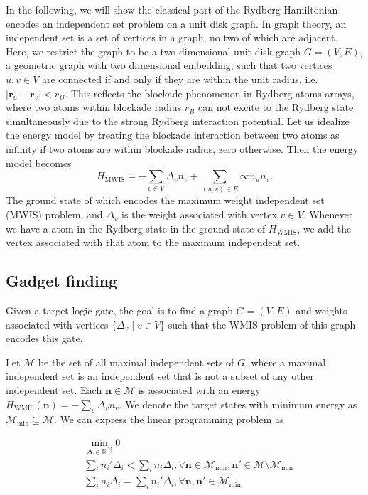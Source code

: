 \documentclass[twocolumn,superscriptaddress,english,showpacs,longbibliography]{revtex4-2}
\begin{document}
In the following, we will show the classical part of the Rydberg Hamiltonian encodes an independent set problem on a unit disk graph.
In graph theory, an independent set is a set of vertices in a graph, no two of which are adjacent.
Here, we restrict the graph to be a two dimensional unit disk graph $G=(V, E)$, a geometric graph with two dimensional embedding, such that two vertices $u, v \in V$ are connected if and only if they are within the unit radius, i.e. $|\mathbf r_u - \mathbf r_v| < r_B$. This reflects the blockade phenomenon in Rydberg atoms arrays, where two atoms within blockade radius $r_B$ can not excite to the Rydberg state simultaneously due to the strong Rydberg interaction potential. Let us idealize the energy model by treating the blockade interaction between two atoms as infinity if two atoms are within blockade radius, zero otherwise. Then the energy model becomes
\begin{equation}
H_{\text{MWIS}} = -\sum_{v \in V}\Delta_v n_v + \sum_{(u, v) \in E} \infty n_u n_v.
\end{equation}
The ground state of which encodes the maximum weight independent set (MWIS) problem, and $\Delta_v$ is the weight associated with vertex $v \in V$. Whenever we have a atom in the Rydberg state in the ground state of $H_{\text{WMIS}}$, we add the vertex associated with that atom to the maximum independent set.

\subsection{Gadget finding}
Given a target logic gate, the goal is to find a graph $G = (V, E)$ and weights associated with vertices $\{\Delta_v \mid v\in V\}$ such that the WMIS problem of this graph encodes this gate.

Let $\mathcal{M}$ be the set of all maximal independent sets of $G$, where a maximal independent set is an independent set that is not a subset of any other independent set.
Each $\mathbf n \in \mathcal{M}$ is associated with an energy $H_{\text{WMIS}}(\mathbf n) = -\sum_v \Delta_v n_v$. We denote the target states with minimum energy as $\mathcal{M}_{\text{min}} \subseteq \mathcal{M}$. We can express the linear programming problem as

\begin{equation}
    \begin{split}
        &\min_{\boldsymbol{\Delta} \in \mathbb{R}^{|V|}} 0\\
        &\sum_i n_i' \Delta_i < \sum_i n_i \Delta_i, \forall \mathbf n \in \mathcal{M}_{\text{min}}, \mathbf n' \in \mathcal{M} \setminus \mathcal{M}_{\text{min}}\\
        &\sum_i n_i \Delta_i = \sum_i n_i' \Delta_i, \forall \mathbf n, \mathbf n' \in \mathcal{M}_{\text{min}}
    \end{split}
\end{equation}
\end{document}
